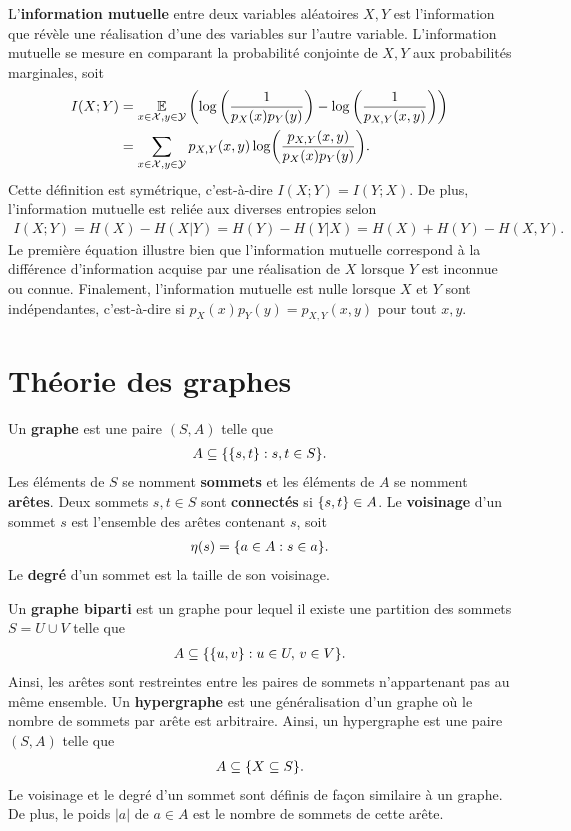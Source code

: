 L'\textbf{information mutuelle} entre deux variables aléatoires $X, Y$ est
l'information que révèle une réalisation d'une des variables sur l'autre variable.
L'information mutuelle se mesure en comparant la probabilité conjointe de $X, Y$
aux probabilités marginales, soit
\begin{align}
  I(X ; Y) 
  &= \operatorname*{\mathbb{E}}_{x\in\mathcal X, y\in\mathcal Y}\qty(
    \log\qty(\frac{1}{p_X(x)p_Y(y)})
    -
    \log\qty(\frac{1}{p_{X, Y}(x, y)})
  ) \notag \\
  &= \sum_{x\in\mathcal X, y \in\mathcal Y}p_{X, Y}(x, y) \log(\frac{p_{X, Y}(x, y)}{p_X(x)p_Y(y)}).
\end{align}
Cette définition est symétrique,
c'est-à-dire $I(X ; Y) = I(Y ; X)$.
De plus,
l'information mutuelle est reliée aux diverses entropies selon
\begin{align}
  I(X;Y)
  = H(X) - H(X | Y)
  = H(Y) - H(Y | X)
  = H(X) + H(Y) - H(X, Y).
\end{align}
Le première équation illustre bien que l'information mutuelle correspond à la différence
d'information acquise par une réalisation de $X$ lorsque $Y$ est inconnue ou connue.
Finalement, l'information mutuelle est nulle lorsque $X$ et $Y$ sont indépendantes,
c'est-à-dire si $p_X(x)p_Y(y) = p_{X,Y}(x,y)$ pour tout $x, y$.


\chapter{Théorie des graphes}
\label{chap:theo_graphe}

Un \textbf{graphe} est une paire $(S, A)$ telle que 
\begin{align}
  A \subseteq \qty{\qty{s, t} : s,t \in S}.
\end{align}
Les éléments de $S$ se nomment \textbf{sommets}
et les éléments de $A$ se nomment \textbf{arêtes}.
Deux sommets $s, t \in S$ sont \textbf{connectés} si $\qty{s, t} \in A$.
Le \textbf{voisinage} d'un sommet $s$ est l'ensemble des arêtes contenant $s$,
soit 
\begin{align}
  \eta(s) = \qty{a \in A : s \in a}.
\end{align}
Le \textbf{degré} d'un sommet est la taille de son voisinage.

Un \textbf{graphe biparti} est un graphe pour lequel il existe une 
partition des sommets $S = U \cup V$ telle que 
\begin{align}
  A \subseteq \qty{\qty{u, v} : u \in U,\, v \in V}.
\end{align}
Ainsi, les arêtes sont restreintes entre les paires de sommets n'appartenant pas
au même ensemble.
Un \textbf{hypergraphe} est une généralisation d'un graphe
où le nombre de sommets par arête est arbitraire.
Ainsi,
un hypergraphe est une paire $(S, A)$ telle que
\begin{align}
  A \subseteq \qty{X \subseteq S}.
\end{align}
Le voisinage et le degré d'un sommet sont définis de façon similaire à un graphe.
De plus, le poids $|a|$ de $a \in A$ est le nombre de sommets de cette arête.

